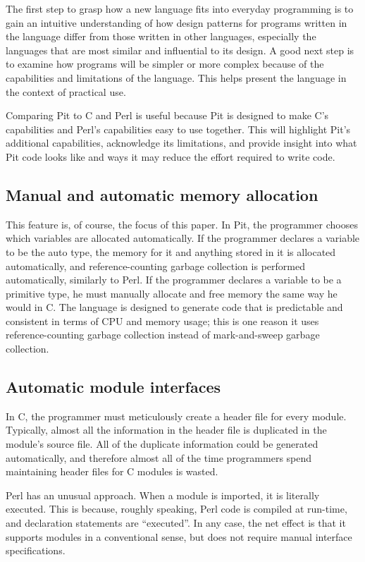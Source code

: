 The first step to grasp how a new language fits into everyday programming is to gain an intuitive understanding of how
design patterns for programs written in the language differ from those written in other languages, especially the
languages that are most similar and influential to its design.  A good next step is to examine how programs will be
simpler or more complex because of the capabilities and limitations of the language.  This helps present the language
in the context of practical use.

Comparing Pit to C and Perl is useful because Pit is designed to make C's capabilities and Perl's capabilities easy to
use together.  This will highlight Pit's additional capabilities, acknowledge its limitations, and provide insight into
what Pit code looks like and ways it may reduce the effort required to write code.

\subsection{Manual and automatic memory allocation}

This feature is, of course, the focus of this paper.
In Pit, the programmer chooses which variables are allocated automatically.  If the programmer declares a variable to be the auto
type, the memory for it and anything stored in it is allocated automatically, and reference-counting garbage collection
is performed automatically, similarly to Perl.  If the programmer declares a variable to be a primitive type, he must manually allocate and free
memory the same way he would in C.  The language is designed to generate code that is predictable and consistent in terms of
CPU and memory usage; this is one reason it uses reference-counting garbage collection instead of mark-and-sweep garbage collection.


\subsection{Automatic module interfaces}

In C, the programmer must meticulously create a header file for every module.  Typically, almost all the information in
the header file is duplicated in the module's source file.  All of the duplicate information could be generated
automatically, and therefore almost all of the time programmers spend maintaining header files for C modules is wasted.

Perl has an unusual approach.  When a module is imported, it is literally executed.  This is because, roughly speaking, Perl code is
compiled at run-time, and declaration statements are ``executed''.  In any case, the net effect is that it supports
modules in a conventional sense, but does not require manual interface specifications.

